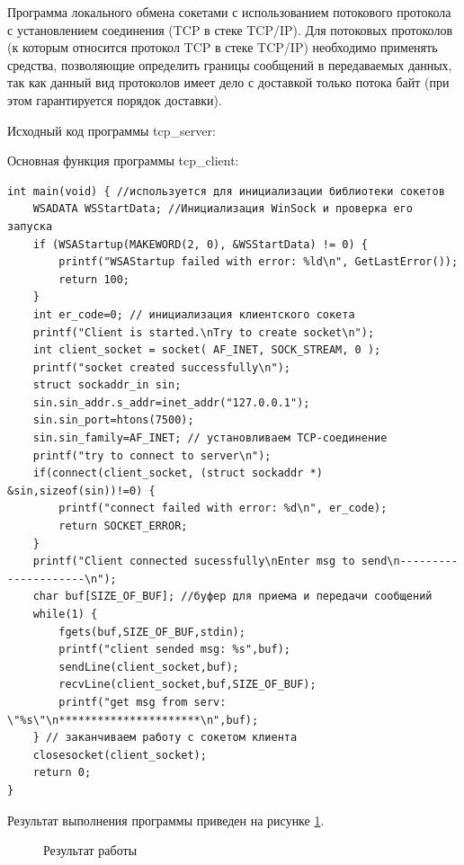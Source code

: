 \documentclass[a4paper]{article}
\begin{document}
	Программа локального обмена сокетами с использованием потокового протокола с установлением соединения (TCP в стеке TCP/IP). Для потоковых протоколов (к которым относится протокол TCP в стеке TCP/IP) необходимо применять средства, позволяющие определить границы сообщений в передаваемых данных, так как данный вид протоколов имеет дело с доставкой только потока байт (при этом гарантируется порядок доставки).
	
	Исходный код программы tcp\_server:
	

	Основная функция программы tcp\_client:
	\begin{lstlisting}[style=crs_cpp]
	int main(void) { //используется для инициализации библиотеки сокетов
    WSADATA WSStartData; //Инициализация WinSock и проверка его запуска
    if (WSAStartup(MAKEWORD(2, 0), &WSStartData) != 0) {
        printf("WSAStartup failed with error: %ld\n", GetLastError());
        return 100;
    }
    int er_code=0; // инициализация клиентского сокета
    printf("Client is started.\nTry to create socket\n");
    int client_socket = socket( AF_INET, SOCK_STREAM, 0 );
    printf("socket created successfully\n");
    struct sockaddr_in sin;
    sin.sin_addr.s_addr=inet_addr("127.0.0.1");
    sin.sin_port=htons(7500);
    sin.sin_family=AF_INET; // установливаем TCP-соединение
    printf("try to connect to server\n");
    if(connect(client_socket, (struct sockaddr *) &sin,sizeof(sin))!=0) {
        printf("connect failed with error: %d\n", er_code);
        return SOCKET_ERROR;
    }
    printf("Client connected sucessfully\nEnter msg to send\n---------------------\n");
    char buf[SIZE_OF_BUF]; //буфер для приема и передачи сообщений
    while(1) {
        fgets(buf,SIZE_OF_BUF,stdin);
        printf("client sended msg: %s",buf);
        sendLine(client_socket,buf);
        recvLine(client_socket,buf,SIZE_OF_BUF);
        printf("get msg from serv: \"%s\"\n**********************\n",buf);
    } // заканчиваем работу с сокетом клиента
    closesocket(client_socket);
    return 0;
}	\end{lstlisting}
	
	Результат выполнения программы приведен на рисунке \ref{img:task6}.
	\begin{figure}[h!]
		\caption{Результат работы}
		\label{img:task6}
	\end{figure}
	
\end{document}

